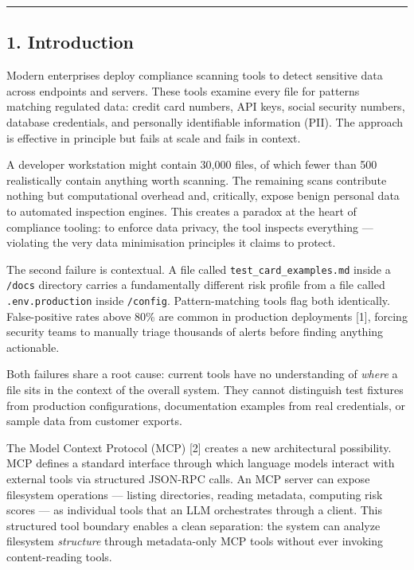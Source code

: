 \documentclass[
]{article}
\begin{document}
\begin{center}\rule{0.5\linewidth}{0.5pt}\end{center}

\subsection{1. Introduction}\label{introduction}

Modern enterprises deploy compliance scanning tools to detect sensitive
data across endpoints and servers. These tools examine every file for
patterns matching regulated data: credit card numbers, API keys, social
security numbers, database credentials, and personally identifiable
information (PII). The approach is effective in principle but fails at
scale and fails in context.

A developer workstation might contain 30,000 files, of which fewer than
500 realistically contain anything worth scanning. The remaining scans
contribute nothing but computational overhead and, critically, expose
benign personal data to automated inspection engines. This creates a
paradox at the heart of compliance tooling: to enforce data privacy, the
tool inspects everything --- violating the very data minimisation
principles it claims to protect.

The second failure is contextual. A file called
\texttt{test\_card\_examples.md} inside a \texttt{/docs} directory
carries a fundamentally different risk profile from a file called
\texttt{.env.production} inside \texttt{/config}. Pattern-matching tools
flag both identically. False-positive rates above 80\% are common in
production deployments {[}1{]}, forcing security teams to manually
triage thousands of alerts before finding anything actionable.

Both failures share a root cause: current tools have no understanding of
\emph{where} a file sits in the context of the overall system. They
cannot distinguish test fixtures from production configurations,
documentation examples from real credentials, or sample data from
customer exports.

The Model Context Protocol (MCP) {[}2{]} creates a new architectural
possibility. MCP defines a standard interface through which language
models interact with external tools via structured JSON-RPC calls. An
MCP server can expose filesystem operations --- listing directories,
reading metadata, computing risk scores --- as individual tools that an
LLM orchestrates through a client. This structured tool boundary enables
a clean separation: the system can analyze filesystem \emph{structure}
through metadata-only MCP tools without ever invoking content-reading
tools.
\end{document}
